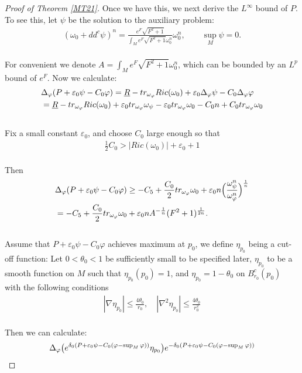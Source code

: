 \documentclass[11pt]{amsart}
\numberwithin{equation}{section}
\begin{document}
\begin{proof}[Proof of Theorem \ref{MT21}]
\noindent
Once we have this, we next derive the $L^{\infty}$ bound of $P$. To see this, let $\psi$ be the solution to the auxiliary problem:
\begin{align}
(\omega_0+dd^c\psi)^n=\frac{e^F\sqrt{F^2+1}}{\int_Me^F\sqrt{F^2+1}\omega_0^n}\omega_0^n,  \qquad \sup_M\psi=0.
\end{align}\\
For convenient we denote $A=\int_Me^F\sqrt{F^2+1}\omega_0^n$, which can be bounded by an $L^p$ bound of $e^F$. Now we calculate:
\begin{align}
	&\Delta_{\varphi}(P+\varepsilon_0\psi-C_0\varphi) =\underline{R}-tr_{\omega_{\varphi}}Ric(\omega_0)+\varepsilon_0 \Delta_{\varphi}\psi-C_0\Delta_{\varphi}\varphi \notag \\
	&=\underline{R}-tr_{\omega_{\varphi}} Ric(\omega_0)+\varepsilon_0tr_{\omega_{\varphi}}\omega_{\psi} -\varepsilon_0tr_{\omega_{\varphi}}\omega_0-C_0n+C_0tr_{\omega_{\varphi}}\omega_0 
\end{align}\\
Fix a small constant $\varepsilon_0$, and choose $C_0$ large enough so that
\begin{align}
	\frac{1}{2}C_0> |Ric(\omega_0)|+\varepsilon_0 +1
\end{align}\\
Then 
\begin{align}
	&\Delta_{\varphi}(P+\varepsilon_0\psi-C_0\varphi) \ge  -C_5 +\frac{C_0}{2}tr_{\omega_{\varphi}}\omega_0 +\varepsilon_0 n\Big(\frac{\omega_{\psi}^n}{\omega_{\varphi}^n}\Big)^{\frac{1}{n}} \notag \\
	& =-C_5 +\frac{C_0}{2}tr_{\omega_{\varphi}}\omega_0 +\varepsilon_0nA^{-\frac{1}{n}}(F^2+1)^{\frac{1}{2n}}.
\end{align}\\
Assume that $P+\varepsilon_0\psi-C_0\varphi$ achieves maximum at $p_0$, we define $\eta_{p_0}$ being a cut-off function: Let $0<\theta_0<1$ be sufficiently small to be specified later,  $\eta_{p_0}$ to be a smooth function on $M$ such that $\eta_{p_0}(p_0)=1$, and $\eta_{p_0}=1-\theta_0$ on $B_{r_0}^c(p_0)$ with the following conditions 
\begin{align}\label{equacutoff}
	|\nabla\eta_{p_0}| \le  \frac{4\theta_0}{r_0}, \quad |\nabla^2\eta_{p_0}|\le  \frac{4\theta_0}{r_0^2}
\end{align}\\
Then we can calculate:
\begin{align}
	&\Delta_{\varphi}\big(e^{\delta_0(P+\varepsilon_0\psi-C_0(\varphi-\sup_M\varphi))}\eta_{p_0}\big) e^{-\delta_0(P+\varepsilon_0\psi-C_0(\varphi-\sup_M\varphi))} \notag \\

\end{align}
\end{proof}
\end{document}
